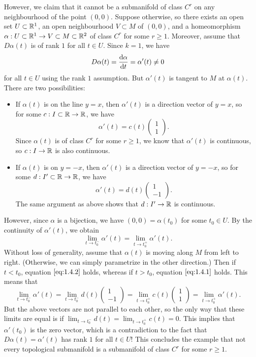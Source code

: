 However, we claim that it cannot be a submanifold of 
class $C^r$ on any neighbourhood of the point $(0, 0)$. 
Suppose otherwise, so there exists an open set $U \subset \mathbb{R}^1$, 
an open neighbourhood $V \subset M$ of $(0, 0)$, and a homeomorphism 
$\alpha : U \subset \mathbb{R}^1 \to V \subset M \subset \mathbb{R}^2$ of class $C^r$ 
for some $r \geq 1$. Moreover, assume that $D\alpha(t)$ is of rank $1$ 
for all $t \in U$. Since $k = 1$, we have 
\[ D\alpha(t) = \frac{{\rm d}\alpha}{{\rm d}t} = \alpha'(t) \neq 0 \] 
for all $t \in U$ using the rank $1$ assumption. But $\alpha'(t)$ 
is tangent to $M$ at $\alpha(t)$. There are two possibilities: 
\begin{itemize}
    \item If $\alpha(t)$ is on the line $y = x$, then $\alpha'(t)$ 
    is a direction vector of $y = x$, so for some $c : I 
    \subset \mathbb{R} \to \mathbb{R}$, we have 
    \[ \alpha'(t) = c(t) \begin{pmatrix} 1 \\ 1 \end{pmatrix}. \tag{1.4.1} \label{eq:1.4.1}\] 
    Since $\alpha(t)$ is of class $C^r$ for some $r \geq 1$, we know that 
    $\alpha'(t)$ is continuous, so $c : I \to \mathbb{R}$ is also continuous.
    \item If $\alpha(t)$ is on $y = -x$, then $\alpha'(t)$ is a 
    direction vector of $y = -x$, so for some $d : I' \subset \mathbb{R} \to \mathbb{R}$, 
    we have 
    \[ \alpha'(t) = d(t) \begin{pmatrix} 1 \\ -1 \end{pmatrix}. \tag{1.4.2} \label{eq:1.4.2} \] 
    The same argument as above shows that $d : I' \to \mathbb{R}$ is continuous.
\end{itemize}
However, since $\alpha$ is a bijection, we have $(0, 0) = \alpha(t_0)$ 
for some $t_0 \in U$. By the continuity of $\alpha'(t)$, we obtain 
\[ \lim_{t\to t_0^-} \alpha'(t) = \lim_{t\to t_0^+} \alpha'(t). \] 
Without loss of generality, assume that $\alpha(t)$ is moving along $M$ 
from left to right. (Otherwise, we can simply parametrize in the other 
direction.) Then if $t < t_0$, equation $\eqref{eq:1.4.2}$ holds, whereas if 
$t > t_0$, equation $\eqref{eq:1.4.1}$ holds. This means that 
\[ \lim_{t\to t_0^-} \alpha'(t) = \lim_{t\to t_0^-} d(t) \begin{pmatrix} 1 \\ -1 \end{pmatrix} 
= \lim_{t\to t_0^+} c(t) \begin{pmatrix} 1 \\ 1 \end{pmatrix} = \lim_{t\to t_0^+} \alpha'(t). \] 
But the above vectors are not parallel to each other, so the only way that 
these limits are equal is if $\lim_{t\to t_0^-} d(t) = 
\lim_{t\to t_0^+} c(t) = 0$. This implies that $\alpha'(t_0)$ is the zero 
vector, which is a contradiction to the fact that $D\alpha(t) = \alpha'(t)$ 
has rank $1$ for all $t \in U$! This concludes the example that not 
every topological submanifold is a submanifold of class $C^r$ for some $r \geq 1$. 

